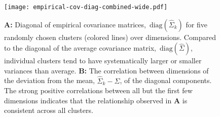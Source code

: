 \begin{figure}[!t]
    \begin{center}
    \texttt{[image: empirical-cov-diag-combined-wide.pdf]}
    \vspace{-.25in}
    \caption{\textbf{A:} Diagonal of empirical covariance matrices,~$\mathrm{diag}(\hat{\Sigma}_k)$ for five randomly chosen clusters (colored lines) over dimensions. Compared to the diagonal of the average covariance matrix,~$\mathrm{diag}(\hat{\Sigma})$, individual clusters tend to have systematically larger or smaller variances than average.
    \textbf{B:} The correlation between dimensions of the deviation from the mean, $\hat{\Sigma}_k - \hat{\Sigma}$, of the diagonal components. The strong positive correlations between all but the first few dimensions indicates that the relationship observed in \textbf{A} is consistent across all clusters.}
    \label{fig:cov-analysis}
    \end{center}
\end{figure}
